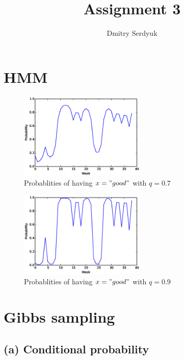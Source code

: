 \documentclass[a4paper]{article}
\author{Dmitry Serdyuk}
\title{Assignment 3}
\date{}
\begin{document}
\section{}
\section{HMM}

\begin{figure}
    \begin{center}
        \includegraphics[width=6cm]{prob_07.eps}
        \caption{Probablities of having $x = "good"$ with $q=0.7$}
        \label{fig:hmm07}
    \end{center}
\end{figure}

\begin{figure}
    \begin{center}
        \includegraphics[width=6cm]{prob_09.eps}
        \caption{Probablities of having $x = "good"$ with $q=0.9$}
        \label{fig:hmm09}
    \end{center}
\end{figure}

\section{}
\section{Gibbs sampling}
\subsection{(a) Conditional probability}
\end{document}
